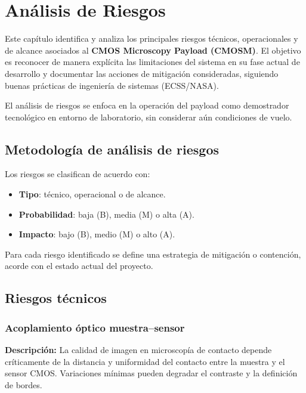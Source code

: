 \chapter{Análisis de Riesgos}
\label{ch:riesgos}

Este capítulo identifica y analiza los principales riesgos técnicos,
operacionales y de alcance asociados al \textbf{CMOS Microscopy Payload (CMOSM)}.
El objetivo es reconocer de manera explícita las limitaciones del sistema en su
fase actual de desarrollo y documentar las acciones de mitigación consideradas,
siguiendo buenas prácticas de ingeniería de sistemas (ECSS/NASA).

El análisis de riesgos se enfoca en la operación del payload como demostrador
tecnológico en entorno de laboratorio, sin considerar aún condiciones de vuelo.

\section{Metodología de análisis de riesgos}

Los riesgos se clasifican de acuerdo con:
\begin{itemize}
    \item \textbf{Tipo}: técnico, operacional o de alcance.
    \item \textbf{Probabilidad}: baja (B), media (M) o alta (A).
    \item \textbf{Impacto}: bajo (B), medio (M) o alto (A).
\end{itemize}

Para cada riesgo identificado se define una estrategia de mitigación o
contención, acorde con el estado actual del proyecto.

\section{Riesgos técnicos}

\subsection{Acoplamiento óptico muestra--sensor}

\textbf{Descripción:}  
La calidad de imagen en microscopía de contacto depende críticamente de la
distancia y uniformidad del contacto entre la muestra y el sensor CMOS. Variaciones
mínimas pueden degradar el contraste y la definición de bordes.

